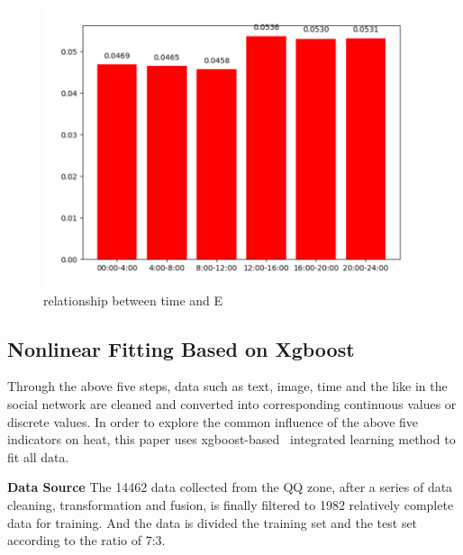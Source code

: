 \documentclass[10pt,twocolumn,letterpaper]{article}
\begin{document}
    \begin{figure}[t]
    \begin{center}
    \includegraphics[width=\linewidth]{e3}
    \end{center}
    \vspace{-0.5cm}
       \caption{relationship between time and E}
       \label{fig:e3}
    \end{figure}

\subsection{Nonlinear Fitting Based on Xgboost}
    Through the above five steps, data such as text, image, time and the like in the social network are cleaned and converted into corresponding continuous values or discrete values.
    In order to explore the common influence of the above five indicators on heat, this paper uses xgboost-based~\cite{Tianqi16} integrated learning method to fit all data.

    \textbf{Data Source}
    The 14462 data collected from the QQ zone, after a series of data cleaning, transformation and fusion, is finally filtered to 1982 relatively complete data for training.
    And the data is divided the training set and the test set according to the ratio of 7:3.
\end{document}
